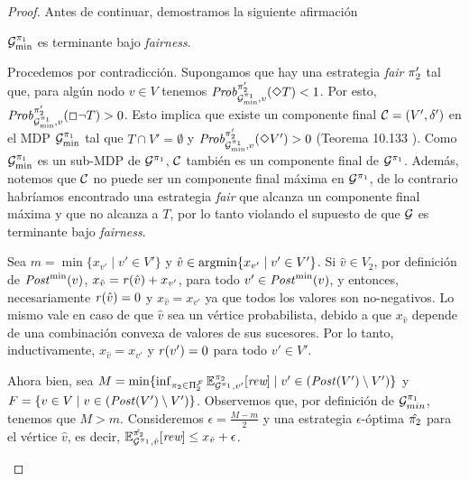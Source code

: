 \begin{proof}
  Antes de continuar, demostramos la siguiente afirmación
  \begin{claim}
    $\mathcal{G}^{\pi_{1}}_{\min}$ es terminante bajo \textit{fairness}.
  \end{claim}
  \begin{proofofclaim}
    Procedemos por contradicción. Supongamos que hay una estrategia \textit{fair} $\pi_{2}'$ tal que, para algún nodo $v \in V$ tenemos
    $\mathit{Prob}^{\pi_{2}'}_{\mathcal{G}_{\min}^{\pi_{1}},v}(\Diamond T) < 1$.
    Por esto,  $\mathit{Prob}^{\pi_{2}'}_{\mathcal{G}_{\min}^{\pi_{1}},v}(\Box \neg T) > 0$.
    Esto implica que existe un componente final $\mathcal{C} = (V',
    \delta')$ en el MDP $\mathcal{G}_{\min}^{\pi_{1}}$ tal que
    $T \cap V' = \emptyset$ y
    $\mathit{Prob}^{\pi_{2}'}_{\mathcal{G}_{\min}^{\pi_{1}},v}(\Diamond V') > 0$
    (Teorema 10.133 \cite[p.~889]{BaierK08}).
    Como $\mathcal{G}_{\min}^{\pi_{1}}$ es un sub-MDP de
    $\mathcal{G}^{\pi_{1}}$, $\mathcal{C}$ también es un componente final de
    $\mathcal{G}^{\pi_{1}}$.
    Además, notemos que $\mathcal{C}$ no puede ser un componente final máxima en
    $\mathcal{G}^{\pi_{1}}$, de lo contrario habríamos encontrado una estrategia \textit{fair} que alcanza un componente final máxima y que no alcanza a $T$, por lo tanto
    violando el supuesto de que $\mathcal{G}$ es terminante bajo
    \textit{fairness}.
    
    Sea $m = \min \{ x_{v'} \mid v' \in V' \}$ y
    $\hat{v} \in \operatorname*{argmin}  \{ x_{v'}  \mid v' \in V' \}$.
    Si $\hat{v}\in V_2$, por definición de $\mathit{Post}^{\min}(v)$,
    $x_{\hat{v}} = \mathit{r}(\hat{v}) + x_{v'}$, para todo
    $v' \in \mathit{Post}^{\min}(v)$, y entonces, necesariamente $\mathit{r}(\hat{v})=0$
    y $x_{\hat{v}} = x_{v'}$ ya que todos los valores son no-negativos.
    Lo mismo vale en caso de que $\hat{v}$ sea un vértice probabilista,
    debido a que $x_{\hat{v}}$ depende de una combinación convexa de valores de sus sucesores.
    Por lo tanto, inductivamente, $x_{\hat{v}} = x_{v'}$ y $\mathit{r}(v')=0$ para
    todo $v'\in V'$.

    Ahora bien, sea
    $M =  \min \{ \inf_{\pi_{2} \in \Pi^{\mathcal{F}}_{2}}  \mathbb{E}^{\pi_{2}}_{\mathcal{G}^{\pi_{1}},v'}[\textit{rew}] \mid v' \in (\mathit{Post}(V') \setminus V')\}$
    y 
    $F=\{v \in V \mid v \in (\mathit{Post}(V') \setminus V')\}$.
    Observemos que, por definición de $\mathcal{G}_{min}^{\pi_{1}}$, tenemos que $M > m$.
    Consideremos $\epsilon = \frac{M -m}{2}$ y una estrategia $\epsilon$-óptima
    $\hat{\pi_{2}}$ para el vértice $\hat{v}$, es decir,
    $\mathbb{E}^{\hat{\pi_{2}}}_{\mathcal{G}^{\pi_{1}},\hat{v}}[\textit{rew}] \leq x_{\hat{v}} + \epsilon$.
    

\end{proofofclaim}
\end{proof}

